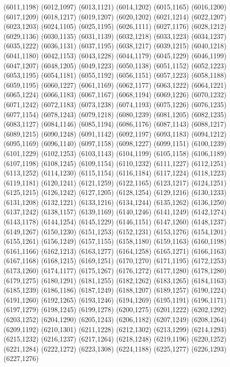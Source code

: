 (6011,1198)
(6012,1097)
(6013,1121)
(6014,1202)
(6015,1165)
(6016,1200)
(6017,1209)
(6018,1217)
(6019,1207)
(6020,1202)
(6021,1214)
(6022,1207)
(6023,1203)
(6024,1105)
(6025,1195)
(6026,1111)
(6027,1176)
(6028,1212)
(6029,1136)
(6030,1135)
(6031,1139)
(6032,1218)
(6033,1223)
(6034,1237)
(6035,1222)
(6036,1131)
(6037,1195)
(6038,1217)
(6039,1215)
(6040,1218)
(6041,1180)
(6042,1153)
(6043,1228)
(6044,1179)
(6045,1229)
(6046,1199)
(6047,1207)
(6048,1205)
(6049,1223)
(6050,1138)
(6051,1152)
(6052,1223)
(6053,1195)
(6054,1181)
(6055,1192)
(6056,1151)
(6057,1223)
(6058,1188)
(6059,1195)
(6060,1227)
(6061,1169)
(6062,1177)
(6063,1222)
(6064,1221)
(6065,1224)
(6066,1183)
(6067,1167)
(6068,1194)
(6069,1226)
(6070,1232)
(6071,1242)
(6072,1183)
(6073,1238)
(6074,1193)
(6075,1226)
(6076,1235)
(6077,1154)
(6078,1243)
(6079,1218)
(6080,1239)
(6081,1205)
(6082,1235)
(6083,1127)
(6084,1146)
(6085,1194)
(6086,1176)
(6087,1143)
(6088,1217)
(6089,1215)
(6090,1248)
(6091,1142)
(6092,1197)
(6093,1183)
(6094,1212)
(6095,1169)
(6096,1140)
(6097,1158)
(6098,1227)
(6099,1151)
(6100,1239)
(6101,1229)
(6102,1253)
(6103,1143)
(6104,1199)
(6105,1158)
(6106,1189)
(6107,1198)
(6108,1245)
(6109,1154)
(6110,1232)
(6111,1227)
(6112,1251)
(6113,1252)
(6114,1230)
(6115,1154)
(6116,1184)
(6117,1224)
(6118,1223)
(6119,1181)
(6120,1241)
(6121,1259)
(6122,1165)
(6123,1217)
(6124,1251)
(6125,1215)
(6126,1242)
(6127,1205)
(6128,1254)
(6129,1216)
(6130,1233)
(6131,1208)
(6132,1221)
(6133,1216)
(6134,1244)
(6135,1262)
(6136,1250)
(6137,1242)
(6138,1157)
(6139,1169)
(6140,1246)
(6141,1249)
(6142,1274)
(6143,1178)
(6144,1254)
(6145,1229)
(6146,1151)
(6147,1260)
(6148,1237)
(6149,1267)
(6150,1230)
(6151,1253)
(6152,1231)
(6153,1276)
(6154,1201)
(6155,1261)
(6156,1249)
(6157,1155)
(6158,1180)
(6159,1163)
(6160,1198)
(6161,1166)
(6162,1213)
(6163,1277)
(6164,1258)
(6165,1271)
(6166,1163)
(6167,1168)
(6168,1215)
(6169,1251)
(6170,1270)
(6171,1195)
(6172,1253)
(6173,1260)
(6174,1177)
(6175,1267)
(6176,1272)
(6177,1280)
(6178,1280)
(6179,1275)
(6180,1291)
(6181,1255)
(6182,1262)
(6183,1265)
(6184,1163)
(6185,1239)
(6186,1186)
(6187,1249)
(6188,1207)
(6189,1257)
(6190,1224)
(6191,1260)
(6192,1265)
(6193,1246)
(6194,1269)
(6195,1191)
(6196,1171)
(6197,1279)
(6198,1245)
(6199,1278)
(6200,1275)
(6201,1222)
(6202,1292)
(6203,1252)
(6204,1290)
(6205,1243)
(6206,1182)
(6207,1249)
(6208,1264)
(6209,1192)
(6210,1301)
(6211,1228)
(6212,1302)
(6213,1299)
(6214,1293)
(6215,1232)
(6216,1237)
(6217,1264)
(6218,1248)
(6219,1196)
(6220,1252)
(6221,1284)
(6222,1272)
(6223,1308)
(6224,1188)
(6225,1277)
(6226,1293)
(6227,1276)
